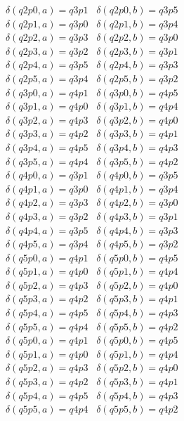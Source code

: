 \documentclass{article}
\begin{document}
\noindent$\delta(q2p0, a) = q3p1$ \  $\delta(q2p0, b) = q3p5$ \\
$\delta(q2p1, a) = q3p0$ \  $\delta(q2p1, b) = q3p4$ \\
$\delta(q2p2, a) = q3p3$ \  $\delta(q2p2, b) = q3p0$ \\
$\delta(q2p3, a) = q3p2$ \  $\delta(q2p3, b) = q3p1$ \\
$\delta(q2p4, a) = q3p5$ \  $\delta(q2p4, b) = q3p3$ \\
$\delta(q2p5, a) = q3p4$ \  $\delta(q2p5, b) = q3p2$ \\

\noindent$\delta(q3p0, a) = q4p1$ \  $\delta(q3p0, b) = q4p5$ \\
$\delta(q3p1, a) = q4p0$ \  $\delta(q3p1, b) = q4p4$ \\
$\delta(q3p2, a) = q4p3$ \  $\delta(q3p2, b) = q4p0$ \\
$\delta(q3p3, a) = q4p2$ \  $\delta(q3p3, b) = q4p1$ \\
$\delta(q3p4, a) = q4p5$ \  $\delta(q3p4, b) = q4p3$ \\
$\delta(q3p5, a) = q4p4$ \  $\delta(q3p5, b) = q4p2$ \\

\noindent$\delta(q4p0, a) = q3p1$ \  $\delta(q4p0, b) = q3p5$ \\
$\delta(q4p1, a) = q3p0$ \  $\delta(q4p1, b) = q3p4$ \\
$\delta(q4p2, a) = q3p3$ \  $\delta(q4p2, b) = q3p0$ \\
$\delta(q4p3, a) = q3p2$ \  $\delta(q4p3, b) = q3p1$ \\
$\delta(q4p4, a) = q3p5$ \  $\delta(q4p4, b) = q3p3$ \\
$\delta(q4p5, a) = q3p4$ \  $\delta(q4p5, b) = q3p2$ \\

\noindent$\delta(q5p0, a) = q4p1$ \  $\delta(q5p0, b) = q4p5$ \\
$\delta(q5p1, a) = q4p0$ \  $\delta(q5p1, b) = q4p4$ \\
$\delta(q5p2, a) = q4p3$ \  $\delta(q5p2, b) = q4p0$ \\
$\delta(q5p3, a) = q4p2$ \  $\delta(q5p3, b) = q4p1$ \\
$\delta(q5p4, a) = q4p5$ \  $\delta(q5p4, b) = q4p3$ \\
$\delta(q5p5, a) = q4p4$ \  $\delta(q5p5, b) = q4p2$ \\

\noindent$\delta(q5p0, a) = q4p1$ \  $\delta(q5p0, b) = q4p5$ \\
$\delta(q5p1, a) = q4p0$ \  $\delta(q5p1, b) = q4p4$ \\
$\delta(q5p2, a) = q4p3$ \  $\delta(q5p2, b) = q4p0$ \\
$\delta(q5p3, a) = q4p2$ \  $\delta(q5p3, b) = q4p1$ \\
$\delta(q5p4, a) = q4p5$ \  $\delta(q5p4, b) = q4p3$ \\
$\delta(q5p5, a) = q4p4$ \  $\delta(q5p5, b) = q4p2$ \\
\end{document}
